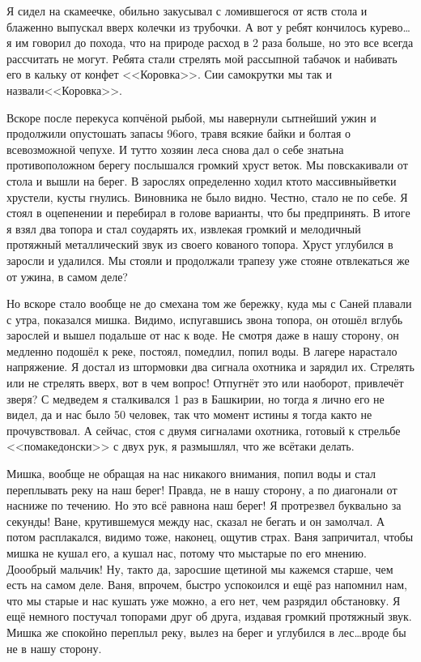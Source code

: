 Я сидел на скамеечке, обильно закусывал с ломившегося от яств стола и блаженно выпускал вверх колечки из трубочки. А вот у ребят кончилось курево\ldots  я им говорил до похода, что на природе расход в 2 раза больше, но это все всегда рассчитать не могут. Ребята стали стрелять мой рассыпной табачок и набивать его в кальку от конфет <<Коровка>>. Сии самокрутки мы так и назвали\mdash <<Коровка>>. 

Вскоре после перекуса копчёной рыбой, мы навернули сытнейший ужин и продолжили опустошать запасы 96\sdash ого, травя всякие байки и болтая о всевозможной чепухе. И тут\sdash то хозяин леса снова дал о себе знать\mdash на противоположном берегу послышался громкий хруст веток. Мы повскакивали от стола и вышли на берег. В зарослях определенно ходил кто\sdash то массивный\mdash ветки хрустели, кусты гнулись. Виновника не было видно. Честно, стало не по себе. Я стоял в оцепенении и перебирал в голове варианты, что бы предпринять. В итоге я взял два топора и стал соударять их, извлекая громкий и мелодичный протяжный металлический звук из своего кованого топора. Хруст углубился в заросли и удалился. Мы стояли и продолжали трапезу уже стоя\mdash не отвлекаться же от ужина, в самом деле? 

Но вскоре стало вообще не до смеха\mdash на том же бережку, куда мы с Саней плавали с утра, показался мишка. Видимо, испугавшись звона топора, он отошёл вглубь зарослей и вышел подальше от нас к воде. Не смотря даже в нашу сторону, он медленно подошёл к реке, постоял, помедлил, попил воды. В лагере нарастало напряжение. Я достал из штормовки два сигнала охотника и зарядил их. Стрелять или не стрелять вверх, вот в чем вопрос! Отпугнёт это или наоборот, привлечёт зверя? С медведем я сталкивался 1 раз в Башкирии, но тогда я лично его не видел, да и нас было 50 человек, так что момент истины я тогда как\sdash то не прочувствовал. А сейчас, стоя с двумя сигналами охотника, готовый к стрельбе <<по\sdash македонски>> с двух рук, я размышлял, что же всё\sdash таки делать. 

Мишка, вообще не обращая на нас никакого внимания, попил воды и стал переплывать реку на наш берег! Правда, не в нашу сторону, а по диагонали от нас\mdash ниже по течению. Но это всё равно\mdash на наш берег! Я протрезвел буквально за секунды! Ване, крутившемуся между нас, сказал не бегать и он замолчал. А потом расплакался, видимо тоже, наконец, ощутив страх. Ваня запричитал, чтобы мишка не кушал его, а кушал нас, потому что мы\mdash старые по его мнению. До\sdash о\sdash о\sdash брый мальчик! Ну, так\sdash то да, заросшие щетиной мы кажемся старше, чем есть на самом деле. Ваня, впрочем, быстро успокоился и ещё раз напомнил нам, что мы старые и нас кушать уже можно, а его нет, чем разрядил обстановку. Я ещё немного постучал топорами друг об друга, издавая громкий протяжный звук. Мишка же спокойно переплыл реку, вылез на берег и углубился в лес\ldots  вроде бы не в нашу сторону.

